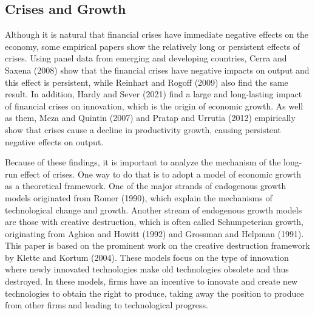 \documentclass[a4paper,12pt]{article}
\begin{document}
\subsection{Crises and Growth}
Although it is natural that financial crises have immediate negative effects on the economy, some empirical papers show the relatively long or persistent effects of crises. Using panel data from emerging and developing countries, Cerra and Saxena (2008) show that the financial crises have negative impacts on output and this effect is persistent, while Reinhart and Rogoff (2009) also find the same result. In addition, Hardy and Sever (2021) find a large and long-lasting impact of financial crises on innovation, which is the origin of economic growth. As well as them, Meza and Quintin (2007) and Pratap and Urrutia (2012) empirically show that crises cause a decline in productivity growth, causing persistent negative effects on output.\par
Because of these findings, it is important to analyze the mechanism of the long-run effect of crises. One way to do that is to adopt a model of economic growth as a theoretical framework. One of the major strands of endogenous growth models originated from Romer (1990), which explain the mechanisms of technological change and growth. Another stream of endogenous growth models are those with creative destruction, which is often called Schumpeterian growth, originating from Aghion and Howitt (1992) and Grossman and Helpman (1991). This paper is based on the prominent work on the creative destruction framework by Klette and Kortum (2004). These models focus on the type of innovation where newly innovated technologies make old technologies obsolete and thus destroyed. In these models, firms have an incentive to innovate and create new technologies to obtain the right to produce, taking away the position to produce from other firms and leading to technological progress.\par
\end{document}
